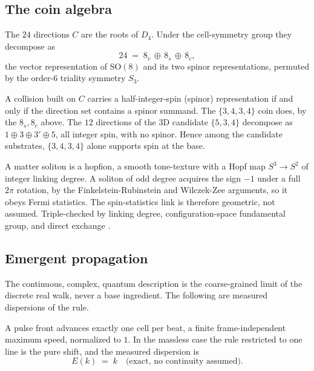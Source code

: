 \subsection{The coin algebra}

\begin{definition}
The $24$ directions $C$ are the roots of $D_4$. Under the cell-symmetry group they decompose as
\[
24 \;=\; 8_v \,\oplus\, 8_s \,\oplus\, 8_c,
\]
the vector representation of $\mathrm{SO}(8)$ and its two spinor representations, permuted by the order-$6$
triality symmetry $S_3$.
\end{definition}

\begin{proposition}
A collision built on $C$ carries a half-integer-spin (spinor) representation if and only if the direction set
contains a spinor summand. The $\{3,4,3,4\}$ coin does, by the $8_s, 8_c$ above. The $12$ directions of the $3$D
candidate $\{5,3,4\}$ decompose as $1 \oplus 3 \oplus 3' \oplus 5$, all integer spin, with no spinor. Hence among
the candidate substrates, $\{3,4,3,4\}$ alone supports spin at the base.
\end{proposition}

\begin{result}
A matter soliton is a hopfion, a smooth tone-texture with a Hopf map $S^3 \to S^2$ of integer linking degree. A
soliton of odd degree acquires the sign $-1$ under a full $2\pi$ rotation, by the Finkelstein-Rubinstein and
Wilczek-Zee arguments, so it obeys Fermi statistics. The spin-statistics link is therefore geometric, not
assumed. Triple-checked by linking degree, configuration-space fundamental group, and direct exchange
\cite{pollard2026vibetest}.
\end{result}

\subsection{Emergent propagation}

The continuous, complex, quantum description is the coarse-grained limit of the discrete real walk, never a base
ingredient. The following are measured dispersions of the rule.

\begin{result}
A pulse front advances exactly one cell per beat, a finite frame-independent maximum speed, normalized to
$1$. In the massless case the rule restricted to one line is the pure shift, and the measured dispersion is
\[
E(k) \;=\; k \quad \text{(exact, no continuity assumed)}.
\]
\end{result}

